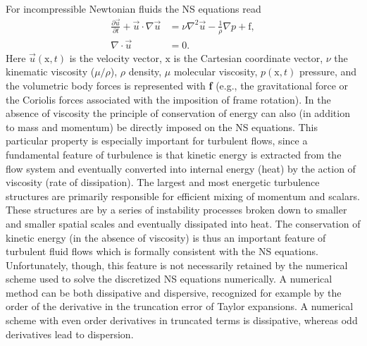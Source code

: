 For incompressible Newtonian fluids the NS equations read
\begin{align}
 \frac{\partial \vec{u}}{\partial t}+\vec{u}\cdot \nabla \vec{u} &= \nu \nabla^2 \vec{u} -\frac{1}{\rho} \nabla p +\text{f}, \label{eq:NS}\\
 \nabla \cdot \vec{u} &=0.
 \label{eq:cont}
\end{align}
Here $\vec{u}(\text{x},t)$ is the velocity vector, $\text{x}$ is the Cartesian coordinate vector, $\nu$ the kinematic
viscosity ($\mu/\rho$), $\rho$ density, $\mu$ molecular viscosity, $p(\text{x},t)$ pressure, and the volumetric body forces is represented with \textbf{f} (e.g., the gravitational force or the Coriolis forces associated with the imposition of frame rotation). In the absence of viscosity the principle of conservation of energy can also (in addition to mass and momentum) be directly imposed on the NS equations. This particular property is especially important for turbulent flows, since a fundamental feature of turbulence is that kinetic energy is extracted from the flow system and eventually converted into internal energy (heat) by the action of viscosity (rate of dissipation). The largest and most energetic turbulence structures are primarily responsible for efficient mixing of momentum and scalars. These structures are by a series of instability processes broken down to smaller and smaller spatial scales and eventually dissipated into heat. The conservation of kinetic energy (in the absence of viscosity) is thus an important feature of turbulent fluid flows which is formally consistent with the NS equations. Unfortunately, though, this feature is not necessarily retained by the numerical scheme used to solve the discretized NS equations numerically. A numerical method can be both dissipative and dispersive, recognized for example by the order of the derivative in the truncation error of Taylor expansions. A numerical scheme with even order derivatives in truncated terms is dissipative, whereas odd derivatives lead to dispersion.
